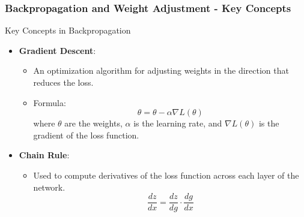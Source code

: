 \documentclass[aspectratio=169]{beamer}
\begin{document}
\begin{frame}[fragile]
    \frametitle{Backpropagation and Weight Adjustment - Key Concepts}
    \begin{block}{Key Concepts in Backpropagation}
        \begin{itemize}
            \item \textbf{Gradient Descent}: 
            \begin{itemize}
                \item An optimization algorithm for adjusting weights in the direction that reduces the loss.
                \item Formula: 
                \[
                \theta = \theta - \alpha \nabla L(\theta)
                \]
                where \( \theta \) are the weights, \( \alpha \) is the learning rate, and \( \nabla L(\theta) \) is the gradient of the loss function.
            \end{itemize}
            \item \textbf{Chain Rule}:
            \begin{itemize}
                \item Used to compute derivatives of the loss function across each layer of the network.
                \begin{equation}
                \frac{dz}{dx} = \frac{dz}{dg} \cdot \frac{dg}{dx}
                \end{equation}
                \end{itemize}
        \end{itemize}
    \end{block}
\end{frame}
\end{document}
